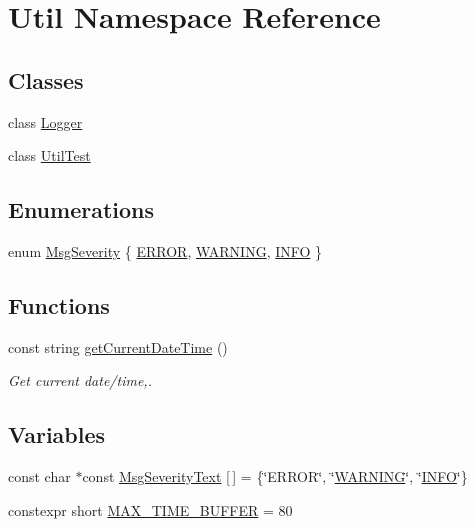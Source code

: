 \hypertarget{namespace_util}{}\section{Util Namespace Reference}
\label{namespace_util}
\subsection*{Classes}
\begin{DoxyCompactItemize}
\item 
class \hyperlink{class_util_1_1_logger}{Logger}
\item 
class \hyperlink{class_util_1_1_util_test}{Util\+Test}
\end{DoxyCompactItemize}
\subsection*{Enumerations}
\begin{DoxyCompactItemize}
\item 
enum \hyperlink{namespace_util_ae07fcfc3e173899e58af09fccd9b8b46}{Msg\+Severity} \{ \hyperlink{namespace_util_ae07fcfc3e173899e58af09fccd9b8b46a3abdb59830ed7913a561b80e6451ee17}{E\+R\+R\+OR}, 
\hyperlink{namespace_util_ae07fcfc3e173899e58af09fccd9b8b46af5fc0c160093801c1330b16e9bc63de6}{W\+A\+R\+N\+I\+NG}, 
\hyperlink{namespace_util_ae07fcfc3e173899e58af09fccd9b8b46addebd6a35663682510acedcc15493ecd}{I\+N\+FO}
 \}
\end{DoxyCompactItemize}
\subsection*{Functions}
\begin{DoxyCompactItemize}
\item 
const string \hyperlink{namespace_util_a9fa6d22a6dbbcfc2f7def6f659036af3}{get\+Current\+Date\+Time} ()
\begin{DoxyCompactList}\small\item\em Get current date/time,. \end{DoxyCompactList}\end{DoxyCompactItemize}
\subsection*{Variables}
\begin{DoxyCompactItemize}
\item 
const char $\ast$const \hyperlink{namespace_util_a7a3d115a18e867870f3f12beceb10a74}{Msg\+Severity\+Text} \mbox{[}$\,$\mbox{]} = \{\char`\"{}E\+R\+R\+OR\char`\"{}, \char`\"{}\hyperlink{namespace_util_ae07fcfc3e173899e58af09fccd9b8b46af5fc0c160093801c1330b16e9bc63de6}{W\+A\+R\+N\+I\+NG}\char`\"{}, \char`\"{}\hyperlink{namespace_util_ae07fcfc3e173899e58af09fccd9b8b46addebd6a35663682510acedcc15493ecd}{I\+N\+FO}\char`\"{}\}
\item 
constexpr short \hyperlink{namespace_util_a8dfc55b47c7119cc05aecc5eeb480e95}{M\+A\+X\+\_\+\+T\+I\+M\+E\+\_\+\+B\+U\+F\+F\+ER} = 80
\end{DoxyCompactItemize}


